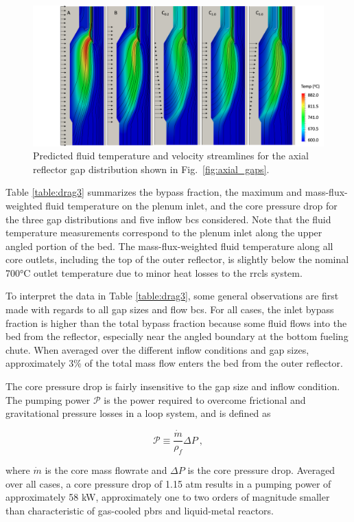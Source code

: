 \begin{figure}[!htb]
\centering
\includegraphics[width=0.85\linewidth]{figs/fluid_temp_axial.png}
\caption{Predicted fluid temperature and velocity streamlines for the axial reflector gap distribution shown in Fig.\ \ref{fig:axial_gaps}.}
\label{fig:bcs_temp3}
\end{figure}

Table \ref{table:drag3} summarizes the bypass fraction, the maximum and mass-flux-weighted fluid temperature on the plenum inlet, and the core pressure drop for the three gap distributions and five inflow \glspl{bc} considered. Note that the fluid temperature measurements correspond to the plenum inlet along the upper angled portion of the bed. The mass-flux-weighted fluid temperature along all core outlets, including the top of the outer reflector, is slightly below the nominal 700\si{\celsius} outlet temperature due to minor heat losses to the \gls{rrcls} system.

To interpret the data in Table \ref{table:drag3}, some general observations are first made with regards to all gap sizes and flow \glspl{bc}. For all cases, the inlet bypass fraction is higher than the total bypass fraction because some fluid flows into the bed from the reflector, especially near the angled boundary at the bottom fueling chute. When averaged over the different inflow conditions and gap sizes, approximately 3\% of the total mass flow enters the bed from the outer reflector. 

The core pressure drop is fairly insensitive to the gap size and inflow condition. The pumping power \(\mathcal{P}\) is the power required to overcome frictional and gravitational pressure losses in a loop system, and is defined as

\begin{equation}
\label{eq:PumpingPower}
\mathcal{P}\equiv\frac{\dot{m}}{\rho_f}\Delta P\ ,
\end{equation}

\noindent where \(\dot{m}\) is the core mass flowrate and \(\Delta P\) is the core pressure drop. Averaged over all cases, a core pressure drop of 1.15 atm results in a pumping power of approximately 58 kW, approximately one to two orders of magnitude smaller than characteristic of gas-cooled \glspl{pbr} and liquid-metal reactors.

